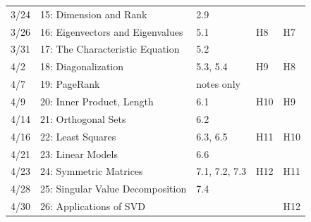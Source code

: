 \documentclass[11pt]{article}
\begin{document}
\begin{centering}
\begin{tabular}{||l|p{3in}|l|l|l||}
3/24 & 15: Dimension and Rank  & 2.9 &  & \\ 
3/26 & 16: Eigenvectors and Eigenvalues  &  5.1 & H8 & H7\\ 
\hline

3/31 & 17: The Characteristic Equation  & 5.2 & & \\ 
4/2 & 18: Diagonalization  & 5.3, 5.4 & H9 & H8\\  %
\hline

4/7 & 19: PageRank  & notes only &  & \\
4/9 & 20: Inner Product, Length   & 6.1 & H10 & H9\\ 
\hline

4/14 &21: Orthogonal Sets & 6.2 &  & \\ 
  4/16 & 22: Least Squares   & 6.3, 6.5 & H11 & H10 \\
  \hline 


4/21 & 23: Linear Models  & 6.6 &  &\\ 
4/23 & 24: Symmetric Matrices  &7.1, 7.2, 7.3 & H12 & H11\\
\hline  
4/28 & 25: Singular Value Decomposition  & 7.4 &  &\\ 
4/30 & 26: Applications of SVD  && & H12 \\

\hline\hline


\end{tabular}\\
\end{centering}
\end{document}
